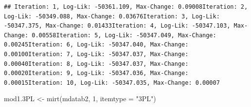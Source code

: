 \documentclass[
]{book}
\newenvironment{Shaded}{\begin{snugshade}}{\end{snugshade}}
\newcommand{\AttributeTok}[1]{\textcolor[rgb]{0.77,0.63,0.00}{#1}}
\newcommand{\DecValTok}[1]{\textcolor[rgb]{0.00,0.00,0.81}{#1}}
\newcommand{\FloatTok}[1]{\textcolor[rgb]{0.00,0.00,0.81}{#1}}
\newcommand{\FunctionTok}[1]{\textcolor[rgb]{0.00,0.00,0.00}{#1}}
\newcommand{\NormalTok}[1]{#1}
\newcommand{\OtherTok}[1]{\textcolor[rgb]{0.56,0.35,0.01}{#1}}
\newcommand{\StringTok}[1]{\textcolor[rgb]{0.31,0.60,0.02}{#1}}
\begin{document}
\begin{verbatim}
## Iteration: 1, Log-Lik: -50361.109, Max-Change: 0.09008Iteration: 2, Log-Lik: -50349.088, Max-Change: 0.03676Iteration: 3, Log-Lik: -50347.375, Max-Change: 0.01433Iteration: 4, Log-Lik: -50347.103, Max-Change: 0.00558Iteration: 5, Log-Lik: -50347.049, Max-Change: 0.00245Iteration: 6, Log-Lik: -50347.040, Max-Change: 0.00100Iteration: 7, Log-Lik: -50347.037, Max-Change: 0.00040Iteration: 8, Log-Lik: -50347.037, Max-Change: 0.00020Iteration: 9, Log-Lik: -50347.036, Max-Change: 0.00015Iteration: 10, Log-Lik: -50347.035, Max-Change: 0.00007
\end{verbatim}

\begin{Shaded}
\begin{Highlighting}[]
\NormalTok{mod1}\FloatTok{.3}\NormalTok{PL }\OtherTok{\textless{}{-}} \FunctionTok{mirt}\NormalTok{(mdatab2, }\DecValTok{1}\NormalTok{, }\AttributeTok{itemtype =} \StringTok{"3PL"}\NormalTok{)}
\end{Highlighting}
\end{Shaded}
\end{document}

